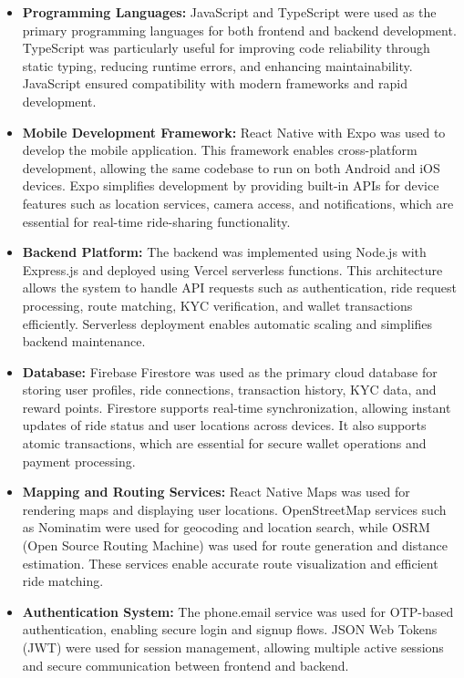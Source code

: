 \documentclass[10pt,a4paper]{report}
\begin{document}
\begin{itemize}

\item \textbf{Programming Languages:}
JavaScript and TypeScript were used as the primary programming languages for both frontend and backend development. TypeScript was particularly useful for improving code reliability through static typing, reducing runtime errors, and enhancing maintainability. JavaScript ensured compatibility with modern frameworks and rapid development.

\item \textbf{Mobile Development Framework:}
React Native with Expo was used to develop the mobile application. This framework enables cross-platform development, allowing the same codebase to run on both Android and iOS devices. Expo simplifies development by providing built-in APIs for device features such as location services, camera access, and notifications, which are essential for real-time ride-sharing functionality.

\item \textbf{Backend Platform:}
The backend was implemented using Node.js with Express.js and deployed using Vercel serverless functions. This architecture allows the system to handle API requests such as authentication, ride request processing, route matching, KYC verification, and wallet transactions efficiently. Serverless deployment enables automatic scaling and simplifies backend maintenance.

\item \textbf{Database:}
Firebase Firestore was used as the primary cloud database for storing user profiles, ride connections, transaction history, KYC data, and reward points. Firestore supports real-time synchronization, allowing instant updates of ride status and user locations across devices. It also supports atomic transactions, which are essential for secure wallet operations and payment processing.

\item \textbf{Mapping and Routing Services:}
React Native Maps was used for rendering maps and displaying user locations. OpenStreetMap services such as Nominatim were used for geocoding and location search, while OSRM (Open Source Routing Machine) was used for route generation and distance estimation. These services enable accurate route visualization and efficient ride matching.

\item \textbf{Authentication System:}
The phone.email service was used for OTP-based authentication, enabling secure login and signup flows. JSON Web Tokens (JWT) were used for session management, allowing multiple active sessions and secure communication between frontend and backend.


\end{itemize}
\end{document}
